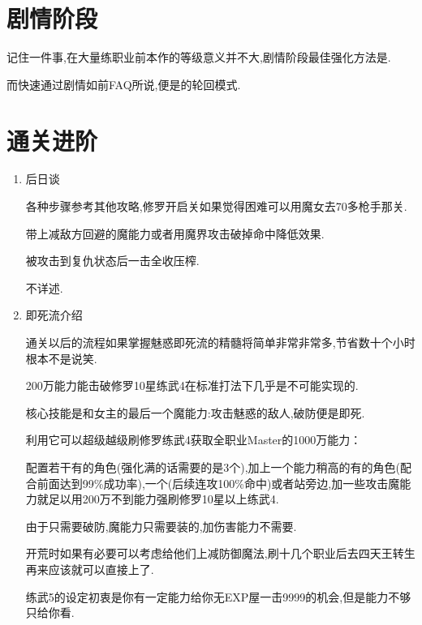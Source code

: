 \newpage

\section{剧情阶段}

记住一件事,在大量练职业前本作的等级意义并不大,剧情阶段最佳强化方法是{\color{red}{捕获+榨取+嗑药}}.

而快速通过剧情如前FAQ所说,便是{\color{red}{魔女+buff+(一触即发)+奥义捕捉+压榨+嗑药}}的轮回模式.

\newpage

\section{通关进阶}

\begin{enumerate}

	\item{后日谈}

	各种步骤参考其他攻略,修罗开启关如果觉得困难可以用魔女去70多枪手那关.

	带上减敌方回避的魔能力或者用魔界攻击破掉命中降低效果.

	被攻击到复仇状态后一击全收压榨.

	不详述.

	\item{即死流介绍}

	通关以后的流程如果掌握魅惑即死流的精髓将简单非常非常多,节省数十个小时根本不是说笑.

	200万能力能击破修罗10星练武4在标准打法下几乎是不可能实现的.

	核心技能是{\color{red}{魅惑魔法}}和女主的最后一个魔能力{\color{red}{生杀予夺}}:攻击魅惑的敌人,破防便是即死.

	利用它可以超级越级刷修罗练武4获取全职业Master的1000万能力：

	配置若干有{\color{red}{飞蛾魔能力}}的角色(强化满的话需要的是3个),加上一个能力稍高的有{\color{red}{强化9范围9魅惑}}的角色(配合前面达到99\%成功率),一个{\color{red}{枪手}}(后续连攻100\%命中)或者{\color{red}{眼镜天使}}站旁边,加一些攻击魔能力就足以用200万不到能力强刷修罗10星以上练武4.

	由于只需要破防,魔能力只需要装{\color{red}{加数值加攻击}}的,加伤害能力不需要.

	开荒时如果有必要可以考虑给他们上减防御魔法,刷十几个职业后去四天王转生再来应该就可以直接上了.

	练武5的设定初衷是你有一定能力给你无EXP屋一击9999的机会,但是能力不够只给你看.


\end{enumerate}
